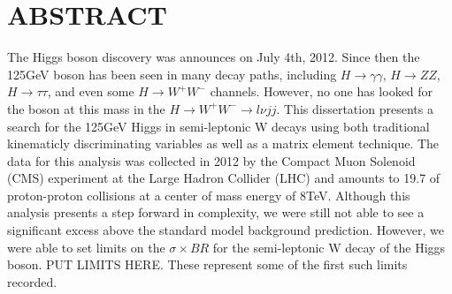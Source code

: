 %
%
%

\chapter*{ABSTRACT}

\pagestyle{plain} %
\setcounter{page}{2}

\indent The Higgs boson discovery was announces on July 4th, 2012. Since then the 125\unit{\GeV} boson has been seen in many decay paths, including $H{\rightarrow}\gamma\gamma$, $H{\rightarrow}ZZ$, $H{\rightarrow}\tau\tau$, and even some $H{\rightarrow}W^{+}W^{-}$ channels.
However, no one has looked for the boson at this mass in the $H{\rightarrow}W^{+}W^{-}{\rightarrow}l{\nu}jj$.
This dissertation presents a search for the 125\unit{\GeV} Higgs in semi-leptonic W decays using both traditional kinematicly discriminating variables as well as a matrix element technique.
The data for this analysis was collected in 2012 by the Compact Muon Solenoid (CMS) experiment at the Large Hadron Collider (LHC) and amounts to 19.7\unit{\fbinv} of proton-proton collisions at a center of mass energy of 8\unit{\TeV}.
Although this analysis presents a step forward in complexity, we were still not able to see a significant excess above the standard model background prediction.
However, we were able to set limits on the $\sigma\times{BR}$ for the semi-leptonic W decay of the Higgs boson.
PUT LIMITS HERE.
These represent some of the first such limits recorded.


 

\pagebreak{}



